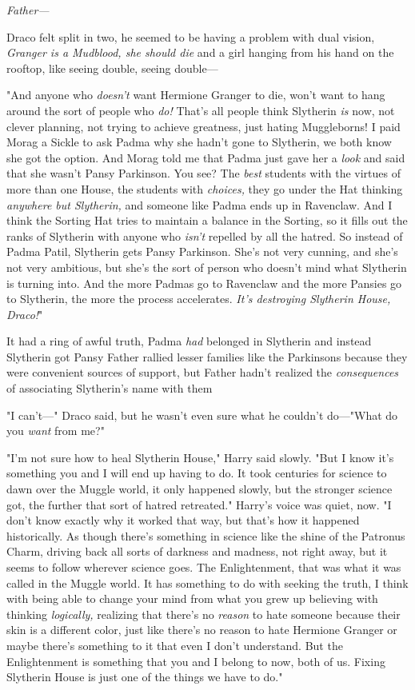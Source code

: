 \emph{Father---}

Draco felt split in two, he seemed to be having a problem with dual vision,
\emph{Granger is a Mudblood, she should die} and a girl hanging from his hand
on the rooftop, like seeing double, seeing double---

"And anyone who \emph{doesn't} want Hermione Granger to die, won't want to hang
around the sort of people who \emph{do!} That's all people think Slytherin
\emph{is} now, not clever planning, not trying to achieve greatness, just
hating Muggleborns! I paid Morag a Sickle to ask Padma why she hadn't gone to
Slytherin, we both know she got the option. And Morag told me that Padma just
gave her a \emph{look} and said that she wasn't Pansy Parkinson. You see? The
\emph{best} students with the virtues of more than one House, the students with
\emph{choices,} they go under the Hat thinking \emph{anywhere but Slytherin,}
and someone like Padma ends up in Ravenclaw. And{\el} I think the Sorting
Hat tries to maintain a balance in the Sorting, so it fills out the ranks of
Slytherin with anyone who \emph{isn't} repelled by all the hatred. So instead
of Padma Patil, Slytherin gets Pansy Parkinson. She's not very cunning, and
she's not very ambitious, but she's the sort of person who doesn't mind what
Slytherin is turning into. And the more Padmas go to Ravenclaw and the more
Pansies go to Slytherin, the more the process accelerates. \emph{It's
destroying Slytherin House, Draco!}"

It had a ring of awful truth, Padma \emph{had} belonged in Slytherin{\el}
and instead Slytherin got Pansy{\el} Father rallied lesser families like the
Parkinsons because they were convenient sources of support, but Father hadn't
realized the \emph{consequences} of associating Slytherin's name with
them{\el}

"I can't\mbox{---}" Draco said, but he wasn't even sure what he couldn't do\mbox{---}"What do
you \emph{want} from me?"

"I'm not sure how to heal Slytherin House," Harry said slowly. "But I know it's
something you and I will end up having to do. It took centuries for science to
dawn over the Muggle world, it only happened slowly, but the stronger science
got, the further that sort of hatred retreated." Harry's voice was quiet, now.
"I don't know exactly why it worked that way, but that's how it happened
historically. As though there's something in science like the shine of the
Patronus Charm, driving back all sorts of darkness and madness, not right away,
but it seems to follow wherever science goes. The Enlightenment, that was what
it was called in the Muggle world. It has something to do with seeking the
truth, I think{\el} with being able to change your mind from what you grew
up believing{\el} with thinking \emph{logically,} realizing that there's no
\emph{reason} to hate someone because their skin is a different color, just
like there's no reason to hate Hermione Granger{\el} or maybe there's
something to it that even I don't understand. But the Enlightenment is
something that you and I belong to now, both of us. Fixing Slytherin House is
just one of the things we have to do."

